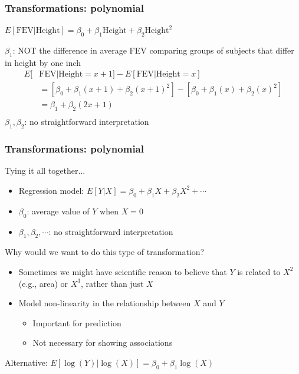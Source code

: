 \documentclass[12pt, 
hyperref={colorlinks=true, linkcolor=blue, urlcolor=cyan},dvipsnames]{beamer}
\begin{document}
\begin{frame}
\frametitle{Transformations: polynomial}
\begin{center} $E[\text{FEV}| \text{Height}] = \beta_0 + \beta_1 \text{Height} + \beta_2 \text{Height}^2$ \end{center}

$\beta_1$: \color{red} NOT \color{black} the difference in average FEV comparing groups of subjects that differ in height by one inch\pause
\begin{align*}
E[&\text{FEV}|\text{Height} = x+1] -E[\text{FEV}|\text{Height} = x]\\
& = \left[\beta_0 + \beta_1 (x+1) + \beta_2(x+1)^2\right] -\left[\beta_0 + \beta_1 (x) + \beta_2(x)^2\right]\\
& = \beta_1 + \beta_2(2x+1) \\
\end{align*}\pause
\color{blue} $\beta_1,\beta_2$: no straightforward interpretation \color{black}
\end{frame}

\begin{frame}
\frametitle{Transformations: polynomial}
Tying it all together...
\begin{itemize}
\item \color{blue} Regression model: \color{black} $E[Y|X] = \beta_0 + \beta_1X + \beta_2 X^2 + \cdots$
\item \color{blue} $\beta_0$: \color{black} average value of $Y$ when $X = 0$
\item \color{blue} $\beta_1, \beta_2, \cdots$: \color{black} no straightforward interpretation
\end{itemize}\pause

Why would we want to do this type of transformation?
\begin{itemize}
\item Sometimes we might have scientific reason to believe that $Y$ is related to $X^2$ (e.g., area) or $X^3$, rather than just $X$
\item Model non-linearity in the relationship between $X$ and $Y$
	\begin{itemize}
	\item Important for prediction
	\item Not necessary for showing associations 
	\end{itemize}
\end{itemize}\pause

Alternative: $E[\log(Y)|\log(X)] = \beta_0 + \beta_1 \log(X)$

\end{frame}
\end{document}
